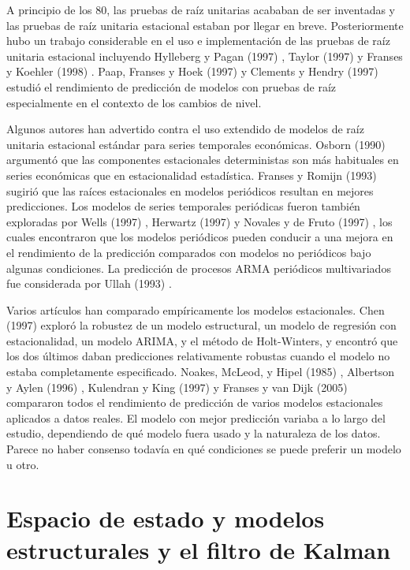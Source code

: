 \documentclass{llncs}
\begin{document}
A principio de los 80, las pruebas de raíz unitarias acababan de ser inventadas y las pruebas de raíz unitaria estacional estaban por llegar en breve. Posteriormente hubo un trabajo considerable en el uso e implementación de las pruebas de raíz unitaria estacional incluyendo Hylleberg y Pagan (1997) \cite{-}, Taylor (1997)\cite{-} y Franses y Koehler (1998) \cite{-}. Paap, Franses y Hoek (1997) \cite{-} y Clements y Hendry (1997) \cite{-} estudió el rendimiento de predicción de modelos con pruebas de raíz especialmente en el contexto de los cambios de nivel.

Algunos autores han advertido contra el uso extendido de modelos de raíz unitaria estacional estándar para series temporales económicas. Osborn (1990) \cite{-} argumentó que las componentes estacionales deterministas son más habituales en series económicas que en estacionalidad estadística. Franses y Romijn (1993) \cite{-} sugirió que las raíces estacionales en modelos periódicos resultan en mejores predicciones. Los modelos de series temporales periódicas fueron también exploradas por Wells (1997) \cite{-}, Herwartz (1997) \cite{-} y Novales y de Fruto (1997) \cite{-}, los cuales encontraron que los modelos periódicos pueden conducir a una mejora en el rendimiento de la predicción comparados con modelos no periódicos bajo algunas condiciones. La predicción de procesos ARMA periódicos multivariados fue considerada por Ullah (1993) \cite{-}.

Varios artículos han comparado empíricamente los modelos estacionales. Chen (1997) exploró la robustez de un modelo estructural, un modelo de regresión con estacionalidad, un modelo ARIMA, y el método de Holt-Winters, y encontró que los dos últimos daban predicciones relativamente robustas cuando el modelo no estaba completamente especificado. Noakes, McLeod, y Hipel (1985) \cite{-}, Albertson y Aylen (1996) \cite{-}, Kulendran y King (1997) \cite{-} y Franses y van Dijk (2005) compararon todos el rendimiento de predicción de varios modelos estacionales aplicados a datos reales. El modelo con mejor predicción variaba a lo largo del estudio, dependiendo de qué modelo fuera usado y la naturaleza de los datos. Parece no haber consenso todavía en qué condiciones se puede preferir un modelo u otro.

\section{Espacio de estado y modelos estructurales y el filtro de Kalman}
\end{document}
